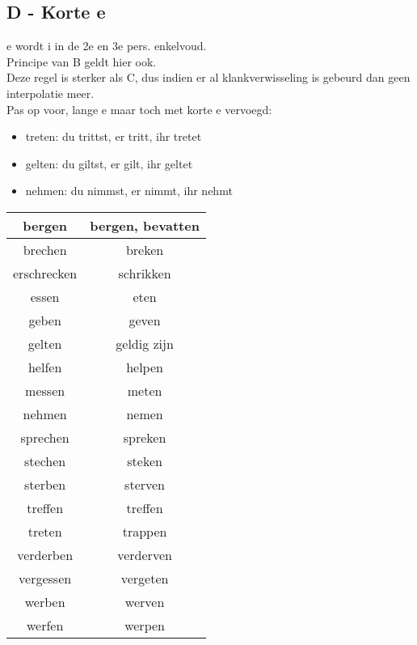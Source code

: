 \documentclass[main.tex]{subfiles}
\begin{document}
\subsection{D - Korte  e }
\begin{minipage}{0.45\textwidth}
e wordt i in de 2e en 3e pers. enkelvoud.\\
Principe van B geldt hier ook.\\
Deze regel is sterker als C, dus indien er al klankverwisseling is gebeurd dan geen interpolatie meer.\\
Pas op voor, lange e maar toch met korte e vervoegd:\\
\begin{itemize}
\item treten: du trittst, er tritt, ihr tretet
\item gelten: du giltst, er gilt, ihr geltet
\item nehmen: du nimmst, er nimmt, ihr nehmt
\end{itemize}
\end{minipage}
\begin{minipage}{0.15\textwidth}
\end{minipage}
\begin{minipage}{0.40\textwidth}
\begin{tabular}[right]{|c|c|}
\hline 
bergen & bergen, bevatten \\ 
\hline 
brechen & breken \\ 
\hline 
erschrecken & schrikken \\ 
\hline 
essen & eten \\ 
\hline 
geben & geven \\ 
\hline 
gelten & geldig zijn \\ 
\hline 
helfen & helpen \\ 
\hline 
messen & meten \\ 
\hline 
nehmen & nemen \\ 
\hline 
sprechen & spreken \\ 
\hline 
stechen & steken \\ 
\hline 
sterben & sterven \\ 
\hline 
treffen & treffen \\ 
\hline 
treten & trappen \\ 
\hline 
verderben & verderven \\ 
\hline 
vergessen & vergeten \\ 
\hline 
werben & werven \\ 
\hline 
werfen & werpen \\ 
\hline 
\end{tabular} 
\end{minipage}
\end{document}
